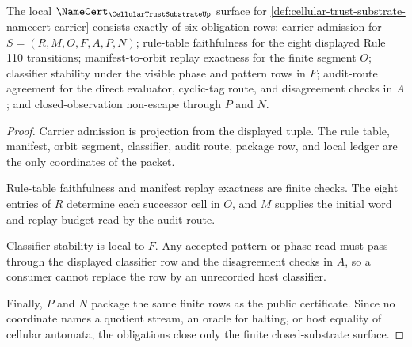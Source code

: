 \begin{theorem}
\label{thm:cellular-trust-substrate-namecert-obligations}
The local $\NameCert_{\CellularTrustSubstrateUp}$ surface for \autoref{def:cellular-trust-substrate-namecert-carrier} consists exactly of six obligation rows: carrier admission for $S=(R,M,O,F,A,P,N)$; rule-table faithfulness for the eight displayed Rule 110 transitions; manifest-to-orbit replay exactness for the finite segment $O$; classifier stability under the visible phase and pattern rows in $F$; audit-route agreement for the direct evaluator, cyclic-tag route, and disagreement checks in $A$; and closed-observation non-escape through $P$ and $N$.
\end{theorem}
\begin{proof}
Carrier admission is projection from the displayed tuple. The rule table, manifest, orbit segment, classifier, audit route, package row, and local ledger are the only coordinates of the packet.

Rule-table faithfulness and manifest replay exactness are finite checks. The eight entries of $R$ determine each successor cell in $O$, and $M$ supplies the initial word and replay budget read by the audit route.

Classifier stability is local to $F$. Any accepted pattern or phase read must pass through the displayed classifier row and the disagreement checks in $A$, so a consumer cannot replace the row by an unrecorded host classifier.

Finally, $P$ and $N$ package the same finite rows as the public certificate. Since no coordinate names a quotient stream, an oracle for halting, or host equality of cellular automata, the obligations close only the finite closed-substrate surface.
\end{proof}

